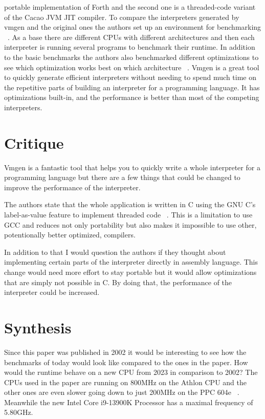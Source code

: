 \documentclass{article}
\begin{document}
portable implementation of Forth and the second one is a threaded-code variant
of the Cacao JVM JIT compiler. To compare the interpreters generated by vmgen
and the original ones the authors set up an environment for benchmarking
~\cite{vmgen}. As a base there are different CPUs with different architectures
and then each interpreter is running several programs to benchmark their
runtime. In addition to the basic benchmarks the authors also benchmarked
different optimizations to see which optimization works best on which
architecture ~\cite{vmgen}. Vmgen is a great tool to quickly generate efficient interpreters
without needing to spend much time on the repetitive parts of building an
interpreter for a programming language. It has optimizations built-in, and the
performance is better than most of the competing interpreters. 

\section{Critique}
Vmgen is a fantastic tool that helps you to quickly write a whole interpreter
for a programming language but there are a few things that could be changed
to improve the performance of the interpreter. 

The authors state that the whole application is written in C using the GNU C’s
label-as-value feature to implement threaded code ~\cite{vmgen}. This is a
limitation to use GCC and reduces not only portability but also makes it
impossible to use other, potentionally better optimized, compilers. 

In addition to that I would question the authors if they thought about
implementing certain parts of the interpreter directly in assembly language.
This change would need more effort to stay portable but it would allow
optimizations that are simply not possible in C. By doing that, the performance
of the interpreter could be increased.

\section{Synthesis}
Since this paper was published in 2002 it would be interesting to see how the
benchmarks of today would look like compared to the ones in the paper. How
would the runtime behave on a new CPU from 2023 in comparison to 2002? The
CPUs used in the paper are running on 800MHz on the Athlon CPU and the other
ones are even slower going down to just 200MHz on the PPC 604e ~\cite{vmgen}.
Meanwhile the new Intel Core i9-13900K Processor has a maximal frequency of
5.80GHz.
\end{document}

